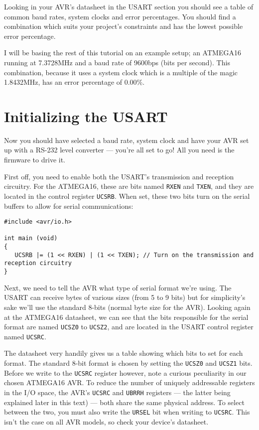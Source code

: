 \documentclass[a4paper,oneside,notitlepage]{book}
\begin{document}
Looking in your AVR's datasheet in the USART section you should see a table of common baud rates, system clocks and error percentages. You should find a combination which suits your project's constraints and has the lowest possible error percentage.

I will be basing the rest of this tutorial on an example setup; an ATMEGA16 running at 7.3728MHz and a baud rate of 9600bps (bits per second). This combination, because it uses a system clock which is a multiple of the magic 1.8432MHz, has an error percentage of 0.00\%.


\chapter{Initializing the USART}

Now you should have selected a baud rate, system clock and have your AVR set up with a RS-232 level converter --- you're all set to go! All you need is the firmware to drive it.

First off, you need to enable both the USART's transmission and reception circuitry. For the ATMEGA16, these are bits named \texttt{RXEN} and \texttt{TXEN}, and they are located in the control register \texttt{UCSRB}. When set, these two bits turn on the serial buffers to allow for serial communications:

\begin{center}
\begin{lstlisting}
#include <avr/io.h>

int main (void)
{
   UCSRB |= (1 << RXEN) | (1 << TXEN); // Turn on the transmission and reception circuitry
}
\end{lstlisting}
\end{center}

Next, we need to tell the AVR what type of serial format we're using. The USART can receive bytes of various sizes (from 5 to 9 bits) but for simplicity's sake we'll use the standard 8-bits (normal byte size for the AVR). Looking again at the ATMEGA16 datasheet, we can see that the bits responsible for the serial format are named \texttt{UCSZ0} to \texttt{UCSZ2}, and are located in the USART control register named \texttt{UCSRC}.

The datasheet very handily gives us a table showing which bits to set for each format. The standard 8-bit format is chosen by setting the \texttt{UCSZ0} and \texttt{UCSZ1} bits. Before we write to the \texttt{UCSRC} register however, note a curious peculiarity in our chosen ATMEGA16 AVR. To reduce the number of uniquely addressable registers in the I/O space, the AVR's \texttt{UCSRC} and \texttt{UBRRH} registers --- the latter being explained later in this text) --- both share the same physical address. To select between the two, you must also write the \texttt{URSEL} bit when writing to \texttt{UCSRC}. This isn't the case on all AVR models, so check your device's datasheet.
\end{document}
